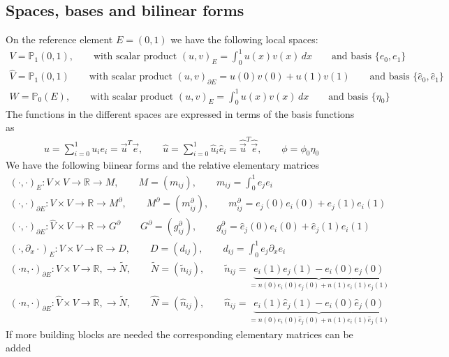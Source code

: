 \subsection{Spaces, bases and bilinear forms}
On the reference element $E = (0,1)$ we have the following local spaces:
\begin{gather*}
	V = \mathbb{P}_1(0,1), \qquad \text{with scalar product } (u,v)_E =  \int_0^1 u(x)v(x)\,dx \qquad \text{and basis }\{e_0, e_1\}\\
	\hat V  = \mathbb{P}_1(0,1)\qquad \text{with scalar product } (u,v)_{\partial E} =  u(0)v(0) + u(1)v(1)\qquad \text{and basis }\{\hat e_0, \hat e_1\}\\
	W = \mathbb{P}_0(E), \qquad  \text{with scalar product } (u,v)_E =  \int_0^1 u(x)v(x)\,dx \qquad \text{and basis }\{\eta_0\}
	\end{gather*}
The functions in the different spaces are expressed in terms of the  basis functions as
\begin{gather*}
u = \sum_{i=0}^1 u_i e_i = \vec u^T \vec e, \qquad \hat u = \sum_{i=0}^1 \hat  u_i \hat e_i =\hat{\vec u}^T \hat {\vec e}, \qquad \phi = \phi_0 \eta_0
\end{gather*}
We have the following biinear forms and the relative elementary matrices
\begin{gather*}
(\cdot,\cdot)_E: V \times V \to \mathbb{R} \longrightarrow M, \qquad M = (m_{ij}), \qquad m_{ij} = \int_0^1 e_j e_i \\
(\cdot,\cdot)_{\partial E}:  V \times V \to \mathbb{R} \longrightarrow M^\partial, \qquad M^\partial = (m^\partial_{ij}), \qquad m^\partial_{ij} =  e_j(0) e_i(0) + e_j(1) e_i(1) \\
(\cdot,\cdot)_{\partial E}: \hat V \times V \to \mathbb{R} \longrightarrow G^\partial  \qquad G^\partial = (g^\partial_{ij}), \qquad g^\partial_{ij} =  \hat e_j(0) e_i(0) + \hat e_j(1) e_i(1)\\
(\cdot , \partial_x \cdot)_E: V \times V \to \mathbb{R} \longrightarrow D, \qquad D = (d_{ij}), \qquad d_{ij} = \int_0^1 e_j \partial_x e_i\\
(\cdot n , \cdot)_{\partial E} : V \times V \to \mathbb{R}, \longrightarrow \widetilde N, \qquad  \widetilde N = (\widetilde n_{ij}), \qquad \widetilde n_{ij} =
\underbrace{e_i(1) e_j(1) -  e_i(0) e_j(0)}_{= n(0) e_i(0) e_j(0) + n(1) e_i(1) e_j(1) }\\
(\cdot n , \cdot)_{\partial E} : \hat V \times V \to \mathbb{R}, \longrightarrow \widetilde N, \qquad  \widehat N = (\widehat n_{ij}), \qquad \widehat n_{ij} =
\underbrace{e_i(1) \hat e_j(1) -  e_i(0) \hat  e_j(0)}_{= n(0) e_i(0) \hat e_j(0) + n(1) e_i(1) \hat e_j(1) }
\end{gather*}
If more building blocks are needed the corresponding elementary matrices can be added 

